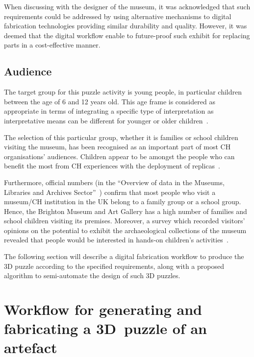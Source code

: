 \documentclass[acmlarge,screen,dvipsnames]{acmart}
\begin{document}
When discussing with the designer of the museum, it was acknowledged
that such requirements could be addressed by using alternative
mechanisms to digital fabrication technologies providing similar
durability and quality. However, it was deemed that the digital
workflow  enable to future-proof such exhibit for replacing parts
in a cost-effective manner.

\subsection{Audience}

The target group for this puzzle activity is young people, in
particular children between the age of 6 and 12 years old. This age
frame is considered as appropriate in terms of integrating a specific
type of interpretation as interpretative means can be different for
younger or older children~\cite{Tilden1977}.

The selection of this particular group, whether it is families or
school children visiting the museum, has been recognised as an
important part of most CH organisations' audiences. Children appear to
be amongst the people who can benefit the most from CH experiences
with the deployment of replicas~\cite{Cabral2013,Neely2015,Miles2015}.

Furthermore, official numbers (in the ``Overview of data in the
Museums, Libraries and Archives Sector''~\cite{Matty2004}) confirm
that most people who visit a museum/CH institution in the UK belong to
a family group or a school group. Hence, the Brighton Museum and Art
Gallery has a high number of families and school children visiting
its premises. Moreover, a survey which recorded
visitors' opinions on the potential to exhibit the archaeological
collections of the museum revealed that people would be interested in
hands-on children's activities~\cite{RoyalPavilionandMuseums2015}.

The following section will describe a digital fabrication workflow to
produce the 3D puzzle according to the specified requirements, along
with a proposed algorithm to semi-automate the design of such 3D
puzzles.

\section{Workflow for generating and fabricating a
  3D~puzzle of an artefact}
\label{workflow}
\end{document}
